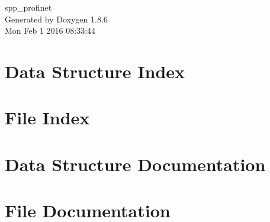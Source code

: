 \documentclass[twoside]{book}
\newcommand{\clearemptydoublepage}{%
  \newpage{\pagestyle{empty}\cleardoublepage}%
}
\begin{document}
\hypersetup{pageanchor=false}
\begin{titlepage}
\vspace*{7cm}
\begin{center}%
{\Large spp\-\_\-profinet }\\
\vspace*{1cm}
{\large Generated by Doxygen 1.8.6}\\
\vspace*{0.5cm}
{\small Mon Feb 1 2016 08:33:44}\\
\end{center}
\end{titlepage}
\clearemptydoublepage
\tableofcontents
\clearemptydoublepage
{}
\hypersetup{pageanchor=true}

\chapter{Data Structure Index}

\chapter{File Index}

\chapter{Data Structure Documentation}
















\chapter{File Documentation}
















\newpage
{}
{}
\printindex
\end{document}
